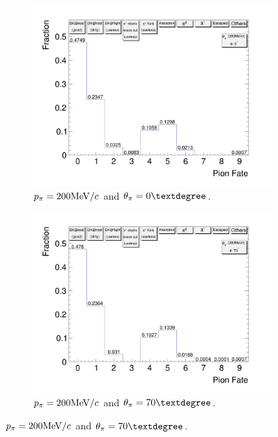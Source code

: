           \begin{figure}[t]
               \centering
               \begin{subfigure}{\dbfigwid\textwidth}
                    \includegraphics[width=\textwidth]{figures/sel/pion_fate_200_0.png}
                    \caption{$p_{\pi}=200\textrm{MeV}/c$ and $\tpi=0\deg$.}
                    \label{subfig:pi-fate-200-0}
               \end{subfigure}
               \begin{subfigure}{\dbfigwid\textwidth}
                    \includegraphics[width=\textwidth]{figures/sel/pion_fate_200_70.png}
                    \caption{$p_{\pi}=200\textrm{MeV}/c$ and $\tpi=70\deg$.}
                    \label{subfig:pi-fate-200-70}

\end{subfigure}
\end{figure}
